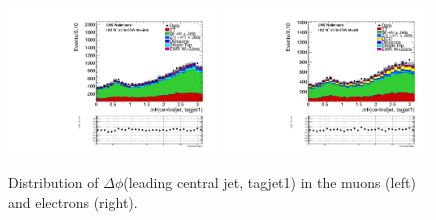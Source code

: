 \begin{figure}
\begin{center}
\includegraphics[width=0.49\textwidth]{figs/n-1_plots_mu/mu_EWK_W_2jets_centraljet_tagjet1_deltaphi_mjj_600_tagjet1_60_tagjet2_50_Zeppenfield_1point2_EWKW2jets.pdf}
\includegraphics[width=0.49\textwidth]{figs/n-1_plots_el/el_EWK_W_2jets_centraljet_tagjet1_deltaphi_mjj_600_tagjet1_60_tagjet2_50_Zeppenfield_1point2_met_30_WmT_30_EWKW2jets.pdf}
\end{center}
\caption{Distribution of $\Delta \phi$(leading central jet, tagjet1) in the muons (left) and electrons (right).}
\label{fig:centraljetdeltaphijettagjet1_20}
\end{figure}

